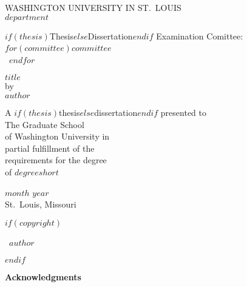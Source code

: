 \documentclass[12pt, oneside, openany]{book}
\begin{document}
\pagestyle{plain}

\frontmatter

\clearpage
\thispagestyle{empty}
\singlespacing
\begin{center}
    WASHINGTON UNIVERSITY IN ST.~LOUIS\\[\baselineskip]

    $department$

    \vfill

    $if(thesis)$Thesis$else$Dissertation$endif$ Examination Comittee:\\
    $for(committee)$$committee$~\\~$endfor$

    \vfill

    $title$\\
    by\\
    $author$

    \vfill

    A $if(thesis)$thesis$else$dissertation$endif$ presented to\\
    The Graduate School\\
    of Washington University in\\
    partial fulfillment of the\\
    requirements for the degree\\
    of $degreeshort$

    \vfill

    $month$ $year$\\
    St.~Louis, Missouri
\end{center}
\clearpage

$if(copyright)$
    \thispagestyle{empty}
    \null
    \vfill
    \begin{center}
        \textcopyright\ $author$
    \end{center}
    \vfill
    \clearpage
$endif$

\setcounter{page}{2}
\tableofcontents
\clearpage
{}
\listoffigures
\clearpage
{}
\listoftables

\clearpage
\doublespacing
{}
\begin{center}
    \textbf{\Huge Acknowledgments}
\end{center}
\end{document}
